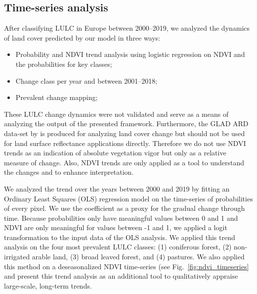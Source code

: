 \subsection*{Time-series analysis}
    
    After classifying LULC in Europe between 2000--2019, we analyzed the dynamics of land cover predicted by our model in three ways:
    \begin{itemize}
        \item Probability and NDVI trend analysis using logistic regression on NDVI and the probabilities for key classes;
        \item Change class per year and between 2001--2018;
        \item Prevalent change mapping;
    \end{itemize} 
    
    These LULC change dynamics were not validated and serve as a means of analyzing the output of the presented framework. Furthermore, the GLAD ARD data-set by \citet{potapov2020landsat} is produced for analyzing land cover change but should not be used for land surface reflectance applications directly. Therefore we do not use NDVI trends as an indication of absolute vegetation vigor but only as a relative measure of change. Also, NDVI trends are only applied as a tool to understand the changes and to enhance interpretation. 
    
    We analyzed the trend over the years between 2000 and 2019 by fitting an Ordinary Least Squares (OLS) regression model on the time-series of probabilities of every pixel. We use the coefficient as a proxy for the gradual change through time. Because probabilities only have meaningful values between 0 and 1 and NDVI are only meaningful for values between -1 and 1, we applied a logit transformation to the input data of the OLS analysis. We applied this trend analysis on the four most prevalent LULC classes: (1) coniferous forest, (2) non-irrigated arable land, (3) broad leaved forest, and (4) pastures. We also applied this method on a deseasonalized \citep{seabold2010statsmodels} NDVI time-series (see Fig.\@~\ref{fig:ndvi_timeseries} and present this trend analysis as an additional tool to qualitatively appraise large-scale, long-term trends.

